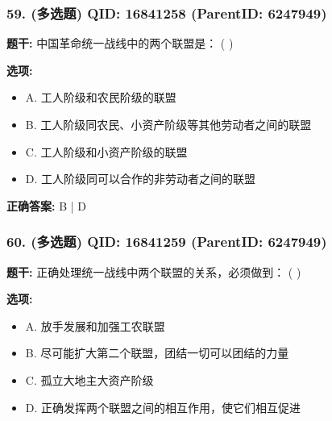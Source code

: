 \documentclass[12pt,UTF8]{ctexart}
\begin{document}
\vspace{0.3em}\hrulefill\vspace{0.7em}

\subsubsection*{59. (多选题) \small QID: 16841258 (ParentID: 6247949)}

\textbf{题干:}
中国革命统一战线中的两个联盟是： ( )



\textbf{选项:}
\begin{itemize}[leftmargin=*]

  \item A. 工人阶级和农民阶级的联盟

  \item B. 工人阶级同农民、小资产阶级等其他劳动者之间的联盟

  \item C. 工人阶级和小资产阶级的联盟

  \item D. 工人阶级同可以合作的非劳动者之间的联盟

\end{itemize}

\textbf{正确答案:}
B | D

\vspace{0.3em}\hrulefill\vspace{0.7em}

\subsubsection*{60. (多选题) \small QID: 16841259 (ParentID: 6247949)}

\textbf{题干:}
正确处理统一战线中两个联盟的关系，必须做到： ( )



\textbf{选项:}
\begin{itemize}[leftmargin=*]

  \item A. 放手发展和加强工农联盟

  \item B. 尽可能扩大第二个联盟，团结一切可以团结的力量

  \item C. 孤立大地主大资产阶级

  \item D. 正确发挥两个联盟之间的相互作用，使它们相互促进

\end{itemize}
\end{document}
